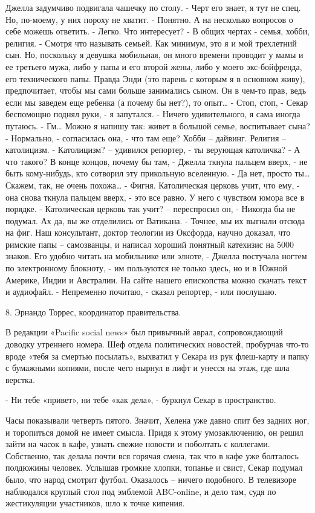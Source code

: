 \documentclass{book}
\begin{document}
Джелла задумчиво подвигала чашечку по столу.
- Черт его знает, я тут не спец. Но, по-моему, у них пороху не хватит.
- Понятно. А на несколько вопросов о себе можешь ответить.
- Легко. Что интересует?
- В общих чертах - семья, хобби, религия.
- Смотря что называть семьей. Как минимум, это я и мой трехлетний сын. Но, поскольку я девушка мобильная, он много времени проводит у мамы и ее третьего мужа, либо у папы и его второй жены, либо у моего экс-бойфренда, его технического папы. Правда Энди (это парень с которым я в основном живу), предпочитает, чтобы мы сами больше занимались сыном. Он в чем-то прав, ведь если мы заведем еще ребенка (а почему бы нет?), то опыт\ldots{}
- Стоп, стоп, - Секар беспомощно поднял руки, - я запутался.
- Ничего удивительного, я сама иногда путаюсь.
- Гм\ldots{} Можно я напишу так: живет в большой семье, воспитывает сына?
- Нормально, - согласилась она, - что там еще? Хобби -- дайвинг. Религия -- католицизм.
- Католицизм? -- удивился репортер, - ты верующая католичка?
- А что такого? В конце концов, почему бы там, - Джелла ткнула пальцем вверх, - не быть кому-нибудь, кто сотворил эту прикольную вселенную.
- Да нет, просто ты\ldots{} Скажем, так, не очень похожа\ldots{}
- Фигня. Католическая церковь учит, что ему, - она снова ткнула пальцем вверх, - это все равно. У него с чувством юмора все в порядке.
- Католическая церковь так учит? -- переспросил он, - Никогда бы не подумал. Ах да, вы же отделились от Ватикана.
- Точнее, мы их выгнали отсюда на фиг. Наш консультант, доктор теологии из Оксфорда, научно доказал, что римские папы -- самозванцы, и написал хороший понятный катехизис на 5000 знаков. Его удобно читать на мобильнике или элноте, - Джелла постучала ногтем по электронному блокноту, - им пользуются не только здесь, но и в Южной Америке, Индии и Австралии. На сайте нашего епископства можно скачать текст и аудиофайл.
- Непременно почитаю, - сказал репортер, - или послушаю.



8. Эрнандо Торрес, координатор правительства.


В редакции «Pacific social news» был привычный аврал, сопровождающий доводку утреннего номера. Шеф отдела политических новостей, пробурчав что-то вроде «тебя за смертью посылать», выхватил у Секара из рук флеш-карту и папку с бумажными копиями, после чего нырнул в лифт и унесся на этаж, где шла верстка.

- Ни тебе «привет», ни тебе «как дела», - буркнул Секар в пространство.

Часы показывали четверть пятого. Значит, Хелена уже давно спит без задних ног, и торопиться домой не имеет смысла. Придя к этому умозаключению, он решил зайти на часок в кафе, узнать свежие новости и поболтать с коллегами. Собственно, так делала почти вся горячая смена, так что в кафе уже болталось полдюжины человек. Услышав громкие хлопки, топанье и свист, Секар подумал было, что народ смотрит футбол. Оказалось -- ничего подобного. В телевизоре наблюдался круглый стол под эмблемой ABC-online, и дело там, судя по жестикуляции участников, шло к точке кипения.
\end{document}

